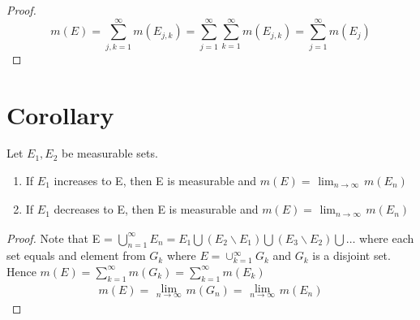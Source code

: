 \documentclass{article}[12 pt]
\begin{document}
\begin{proof}
	\begin{equation}
		m(E) = \sum_{j,k=1}^{\infty}m(E_{j,k}) = \sum_{j=1}^{\infty}\sum_{k=1}^{\infty}m(E_{j,k}) = \sum_{j=1}^{\infty}m(E_{j})
	\end{equation}
\end{proof}
\section{Corollary}
Let $E_1, E_2$ be measurable sets.
\begin{enumerate}
	\item If $E_1$ increases to E, then E is measurable and $m(E) = \substack{\lim_{n\to \infty}}m(E_n)$
	\item If $E_1$ decreases to E, then E is measurable and $m(E) = \substack{\lim_{n\to \infty}}m(E_n)$
\end{enumerate}
\begin{proof}
	Note that E = $\bigcup_{n=1}^{\infty}E_n = E_1 \bigcup (E_2\backslash E_1) \bigcup (E_3\backslash E_2) \bigcup \dots$ where each set equals and element from $G_k$
	where $E = \cup_{k=1}^{\infty}G_k$ and $G_k$ is a disjoint set.
	Hence $m(E) = \sum_{k=1}^{\infty}m(G_k) = \sum_{k=1}^{\infty}m(E_k)$
	\begin{equation}
		m(E) = \substack{\lim_{n\to \infty}}m(G_n) = \substack{\lim_{n\to \infty}}m(E_n)
	\end{equation}
\end{proof}
\end{document}
